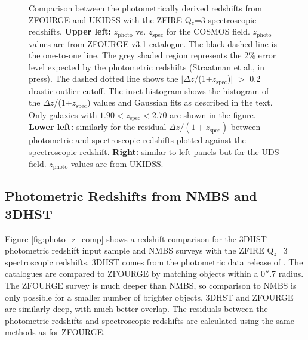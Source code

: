 \documentclass[iop]{emulateapj}
\begin{document}
\begin{figure}
\caption{ Comparison between the photometrically derived redshifts from ZFOURGE and UKIDSS with the ZFIRE Q$_{z}$=3 spectroscopic redshifts. 
{\bf Upper left:} $z_{\mathrm{photo}}$ vs. $z_{\mathrm{spec}}$ for the COSMOS field. $z_{\mathrm{photo}}$ values are from ZFOURGE v3.1 catalogue. 
The black dashed line is the one-to-one line. The grey shaded region represents the 2\% error level expected by the photometric redshifts (Straatman et al., in press). 
The dashed dotted line  shows the $\mid$$\Delta z$/(1+$z_{\mathrm{spec}}$)$\mid$ $>$ 0.2  drastic outlier cutoff.
The inset histogram shows the histogram of the  $\Delta z$/(1+$z_{\mathrm{spec}}$) values and Gaussian fits as described in the text.
Only galaxies with $1.90<z_{\mathrm{spec}}<2.70$ are shown in the figure.  
{\bf Lower left:} similarly for the residual  $\Delta z / (1+z_{\mathrm{spec}})$ between photometric and spectroscopic redshifts plotted against the spectroscopic redshift. 
{\bf Right:} similar to left panels but for the UDS field. $z_{\mathrm{photo}}$ values are from UKIDSS. 
}
\label{fig:specz_photoz}
\end{figure}






\subsection{Photometric Redshifts from NMBS and 3DHST}


Figure \ref{fig:photo_z_comp} shows a redshift comparison for the 3DHST photometric redshift input sample \citep{Skelton2014} and NMBS \citep{Whitaker2011} surveys with the ZFIRE Q$_{z}$=3 spectroscopic redshifts. 3DHST comes from the photometric data release  of \cite{Skelton2014}. 
The catalogues are compared to ZFOURGE by matching objects within a 0$''$.7 radius.
The ZFOURGE survey is much deeper than NMBS, so comparison to NMBS is only possible for a smaller number of brighter objects. 3DHST and ZFOURGE are similarly deep, with much better overlap.
The residuals between the photometric redshifts and spectroscopic redshifts are calculated using the same methods as for ZFOURGE.
\end{document}
